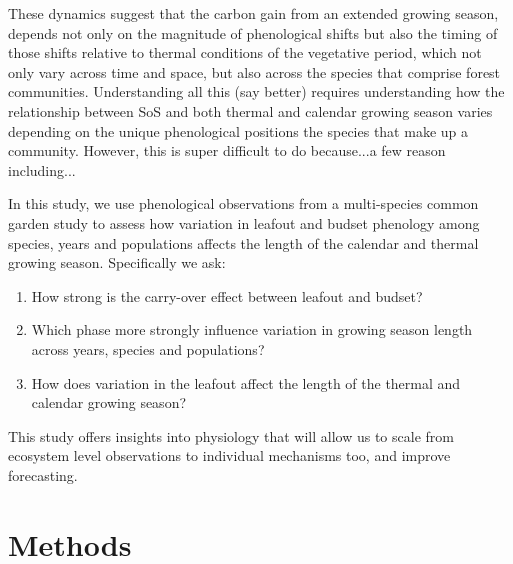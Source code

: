 \documentclass[12 pt]{article}
\begin{document}
These dynamics suggest that the carbon gain from an extended growing season, depends not only on the magnitude of phenological shifts but also the timing of those shifts relative to thermal conditions of the vegetative period, which not only vary across time and space, but also across the species that comprise forest communities. Understanding all this (say better) requires  understanding how the relationship between SoS and both thermal and calendar growing season varies depending on the unique phenological positions the species that make up a community. However, this is super difficult to do because...a few reason including...  

In this study, we use phenological observations from a multi-species common garden study to 
assess how variation in leafout and  budset phenology among species, years and populations affects the length of the calendar and thermal growing season. Specifically we ask:

\begin{enumerate} %
\item How strong is the carry-over effect between leafout and budset? 
\item Which phase more strongly influence variation in growing season length across years, species and populations?
\item How does variation in the leafout affect the length of the thermal and calendar growing season?
\end{enumerate}

This study offers insights into physiology that will allow us to scale from ecosystem level observations to individual mechanisms too, and improve forecasting. %

\section{Methods}
\end{document}
